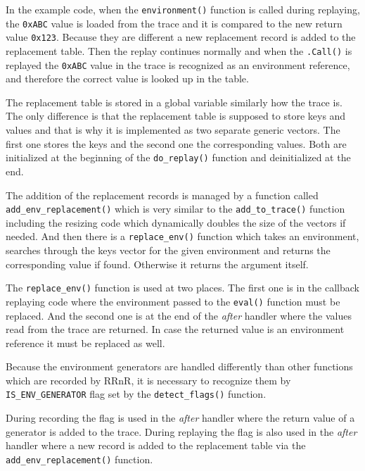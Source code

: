 \documentclass[thesis=M,english,hidelinks]{FITthesis}[2012/10/20]
\begin{document}
		In the example code, when the \lstinline|environment()| function is called during replaying, the \lstinline|0xABC| value is loaded from the trace and it is compared to the new return value \lstinline|0x123|. Because they are different a new replacement record is added to the replacement table. Then the replay continues normally and when the \lstinline|.Call()| is replayed the \lstinline|0xABC| value in the trace is recognized as an environment reference, and therefore the correct value is looked up in the table.\par
		
		The replacement table is stored in a global variable similarly how the trace is. The only difference is that the replacement table is supposed to store keys and values and that is why it is implemented as two separate generic vectors. The first one stores the keys and the second one the corresponding values. Both are initialized at the beginning of the \lstinline|do_replay()| function and deinitialized at the end.\par
		
		The addition of the replacement records is managed by a function called \lstinline|add_env_replacement()| which is very similar to the \lstinline|add_to_trace()| function including the resizing code which dynamically doubles the size of the vectors if needed. And then there is a \lstinline|replace_env()| function which takes an environment, searches through the keys vector for the given environment and returns the corresponding value if found. Otherwise it returns the argument itself.\par
		
		The \lstinline|replace_env()| function is used at two places. The first one is in the callback replaying code where the environment passed to the \lstinline|eval()| function must be replaced. And the second one is at the end of the \emph{after} handler where the values read from the trace are returned. In case the returned value is an environment reference it must be replaced as well.\par
		
		Because the environment generators are handled differently than other functions which are recorded by RRnR, it is necessary to recognize them by \lstinline|IS_ENV_GENERATOR| flag set by the \lstinline|detect_flags()| function.\par
		
		During recording the flag is used in the \emph{after} handler where the return value of a generator is added to the trace. During replaying the flag is also used in the \emph{after} handler where a new record is added to the replacement table via the \lstinline|add_env_replacement()| function.\par
\end{document}
